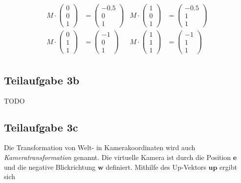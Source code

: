\documentclass[a4paper]{scrartcl}
\begin{document}
\begin{align}
    M \cdot \begin{pmatrix}0\\0\\1\end{pmatrix} &= \begin{pmatrix}-0.5\\0\\1\end{pmatrix} &
    M \cdot \begin{pmatrix}1\\0\\1\end{pmatrix} &= \begin{pmatrix}-0.5\\1\\1\end{pmatrix} \\
    M \cdot \begin{pmatrix}0\\1\\1\end{pmatrix} &= \begin{pmatrix}-1\\0\\1\end{pmatrix} &
    M \cdot \begin{pmatrix}1\\1\\1\end{pmatrix} &= \begin{pmatrix}-1\\1\\1\end{pmatrix} \\
\end{align}




\subsection*{Teilaufgabe 3b}
TODO

\subsection*{Teilaufgabe 3c}
Die Transformation von Welt- in Kamerakoordinaten wird auch
\textit{Kameratransformation} genannt. Die virtuelle Kamera ist durch die
Position $\mathbf{e}$ und die negative Blickrichtung $\mathbf{w}$ definiert.
Mithilfe des Up-Vektors $\mathbf{up}$ ergibt sich
\end{document}
